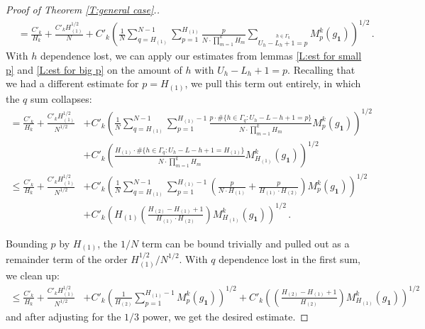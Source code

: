 \documentclass[11pt, oneside]{amsart}   	%
\newcommand{\1}{\mathbbm{1}}
\theoremstyle{definition}
\begin{document}
\begin{proof}[Proof of Theorem \ref{T:general case}.]
\begin{align*}
&= \frac{C'_k}{H_k} + \frac{C'_k H_{(1)}^{1/2}}{N} + C'_k\left(\frac{1}{N} \sum_{q=H_{(1)}}^{N-1} \sum_{p = 1}^{H_{(1)}} \frac{p}{N \cdot \prod_{m=1}^{k} H_m} \sum_{\overset{h \in \Gamma_q}{U_h - L_h +1 = p}} M_p^k (g_{\mathbf{1}})  \right)^{1/2} \, .
\end{align*}
With $h$ dependence lost, we can apply our estimates from lemmas \ref{L:est for small p} and \ref{L:est for big p} on the amount of $h$ with $U_h - L_h + 1 = p$. Recalling that we had a different estimate for $p = H_{(1)}$, we pull this term out entirely, in which the $q$ sum collapses:
\begin{align*}
= \frac{C'_k}{H_k} + \frac{C'_k H_{(1)}^{1/2}}{N^{1/2}} & +C'_k \left(\frac{1}{N} \sum_{q=H_{(1)}}^{N-1} \sum_{p = 1}^{H_{(1)}-1} \frac{p \cdot \#\{h \in \Gamma_q : U_h - L-h + 1 = p\}}{N \cdot \prod_{m=1}^{k} H_m}  M_p^k (g_{\mathbf{1}}) \right)^{1/2} \\ &+ C'_k \left(\frac{H_{(1)} \cdot \#\{h \in \Gamma_q : U_h - L-h + 1 = H_{(1)}\}}{N \cdot \prod_{m=1}^{k} H_m}  M_{H_{(1)}}^k (g_{\mathbf{1}}) \right)^{1/2} \\
\leq \frac{C'_k}{H_k} + \frac{C'_kH_{(1)}^{1/2}}{N^{1/2}} &+ C'_k \left(\frac{1}{N} \sum_{q=H_{(1)}}^{N-1} \sum_{p = 1}^{H_{(1)}-1} \left( \frac{p}{N \cdot H_{(1)}} + \frac{p}{H_{(1)} \cdot H_{(2)}}\right) M_p^k (g_{\mathbf{1}}) \right)^{1/2} \\ &+ C'_k \left(H_{(1)}\left(\frac{H_{(2)} - H_{(1)} + 1}{H_{(1)}\cdot H_{(2)}}\right)  M_{H_{(1)}}^k (g_{\mathbf{1}}) \right)^{1/2} \, .
\end{align*}

Bounding $p$ by $H_{(1)}$, the $1/N$ term can be bound trivially and pulled out as a remainder term of the order $H_{(1)}^{1/2}/N^{1/2}$. With $q$ dependence lost in the first sum, we clean up:
\begin{align*}
\leq \frac{C'_k}{H_k} + \frac{C'_k H_{(1)}^{1/2}}{N^{1/2}}  & + C'_k \left(\frac{1}{H_{(2)}} \sum_{p = 1}^{H_{(1)}-1}  M_p^k (g_{\mathbf{1}}) \right)^{1/2} + C'_k \left(\left(\frac{H_{(2)} - H_{(1)} + 1}{H_{(2)}}\right)  M_{H_{(1)}}^k (g_{\mathbf{1}}) \right)^{1/2}
\end{align*}
and after adjusting for the $1/3$ power, we get the desired estimate.
\end{proof}

\printbibliography
\end{document}

